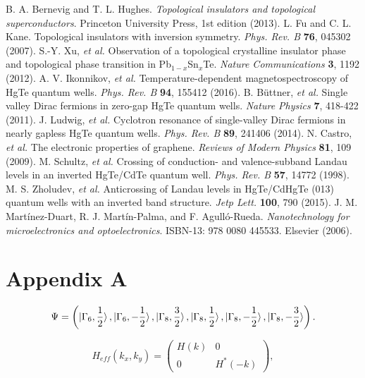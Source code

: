 \documentclass[titlepage,a4paper]{book}
\begin{document}
\begin{thebibliography}{99}
B. A. Bernevig and T. L. Hughes. \textit{Topological insulators and topological superconductors}. Princeton University Press, 1st edition (2013).
L. Fu and C. L. Kane. Topological insulators with inversion symmetry. \textit{Phys. Rev. B} \textbf{76}, 045302 (2007).
S.-Y. Xu, \textit{et al.} Observation of a topological crystalline insulator phase and topological phase transition in Pb$_{1-x}$Sn$_{x}$Te. \textit{Nature Communications} \textbf{3}, 1192 (2012).
A. V. Ikonnikov, \textit{et al.} Temperature-dependent magnetospectroscopy of HgTe quantum wells. \textit{Phys. Rev. B} \textbf{94}, 155412 (2016).
B. Büttner, \textit{et al.} Single valley Dirac fermions in zero-gap HgTe quantum wells. \textit{Nature Physics} \textbf{7}, 418-422 (2011).
J. Ludwig, \textit{et al.} Cyclotron resonance of single-valley Dirac fermions in nearly gapless HgTe quantum wells. \textit{Phys. Rev. B} \textbf{89}, 241406 (2014).
N. Castro, \textit{et al.} The electronic properties of graphene. \textit{Reviews of Modern Physics} \textbf{81}, 109 (2009).
M. Schultz, \textit{et al.} Crossing of conduction- and valence-subband Landau levels in an inverted HgTe/CdTe quantum well. \textit{Phys. Rev. B} \textbf{57}, 14772 (1998).
M. S. Zholudev, \textit{et al.} Anticrossing of Landau levels in HgTe/CdHgTe (013) quantum wells with an inverted band structure. \textit{Jetp Lett.} \textbf{100}, 790 (2015).
J. M. Martínez-Duart, R. J. Martín-Palma, and F. Agulló-Rueda. \textit{Nanotechnology for microelectronics and optoelectronics}. ISBN-13: 978 0080 445533. Elsevier (2006).

\end{thebibliography}

\appendix
\chapter{Appendix A}

\begin{equation}
\label{1}
\Psi = \left( \ket{\Gamma_6, \frac{1}{2}}, \ket{\Gamma_6, -\frac{1}{2}}, \ket{\Gamma_8, \frac{3}{2}}, \ket{\Gamma_8, \frac{1}{2}}, \ket{\Gamma_8, -\frac{1}{2}}, \ket{\Gamma_8, -\frac{3}{2}}  \right).
\end{equation}


\begin{equation}
\label{2}
H_{eff}(k_x, k_y) =  \left( \begin{array}{cc}
H(k) & 0 \\
0 & H^*(-k) \end{array} \right),
\end{equation}
\end{document}
